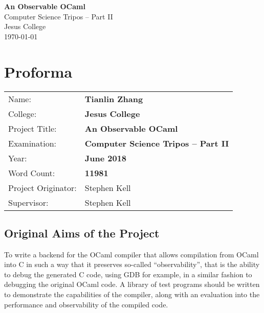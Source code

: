 \documentclass[12pt,a4paper,twoside,openright]{report}
\begin{document}





\pagestyle{empty}


\vspace*{60mm}
\begin{center}
\Huge
\textbf{An Observable OCaml} \\[5mm]
Computer Science Tripos -- Part II \\[5mm]
Jesus College \\[5mm]
\today  %
\end{center}


\pagestyle{plain}

\chapter*{Proforma}

{\large
\begin{tabular}{ll}
Name:               & \bf Tianlin Zhang \\
College:            & \bf Jesus College\\
Project Title:      & \bf An Observable OCaml\\
Examination:        & \bf Computer Science Tripos -- Part II\\
Year:               & \bf June 2018\\
Word Count:         & \bf 11981\footnotemark \\
Project Originator: & Stephen Kell \\
Supervisor:         & Stephen Kell \\ 
\end{tabular}
}

\section*{Original Aims of the Project}

To write a backend for the OCaml compiler that allows compilation from OCaml 
into C in such a way that it preserves so-called ``observability'', that is the 
ability to debug the generated C code, using GDB for example, in a similar 
fashion to debugging the original OCaml code. A library of test programs should 
be written to demonstrate the capabilities of the compiler, along with an 
evaluation into the performance and observability of the compiled code.
\end{document}

